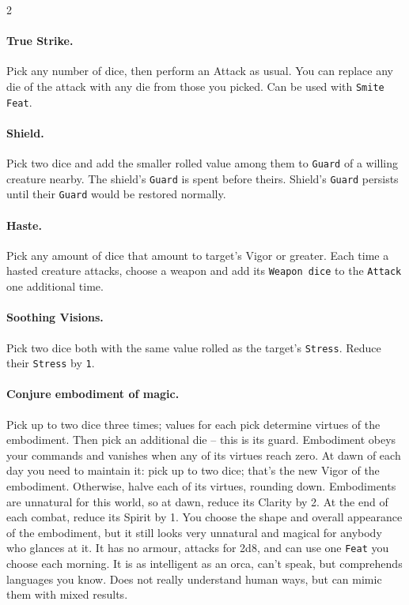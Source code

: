 \documentclass{osr-template/zine}
\begin{document}
\begin{multicols*}{2}
\paragraph{True Strike.}
Pick any number of dice, then perform an Attack as usual.
You can replace any die of the attack with any die from those you picked.
Can be used with \texttt{Smite} \texttt{Feat}.

\paragraph{Shield.} Pick two dice and add the smaller rolled value among them to \texttt{Guard} of a willing creature nearby.
 The shield's \texttt{Guard} is spent before theirs.
 Shield's \texttt{Guard} persists until their \texttt{Guard} would be restored normally.

\paragraph{Haste.} Pick any amount of dice that amount to target's Vigor or greater.
Each time a hasted creature attacks, choose a weapon and add its \texttt{Weapon dice} to the \texttt{Attack} one additional time.

\paragraph{Soothing Visions. } Pick two dice both with the same value rolled as the target's \texttt{Stress}. Reduce their \texttt{Stress} by \texttt{1}.

\paragraph{Conjure embodiment of magic.} Pick up to two dice three times; values for each pick determine virtues of the embodiment.
Then pick an additional die -- this is its guard.
Embodiment obeys your commands and vanishes when any of its virtues reach zero.
At dawn of each day you need to maintain it: pick up to two dice; that's the new Vigor of the embodiment.
Otherwise, halve each of its virtues, rounding down. Embodiments are unnatural for this world, so at dawn, reduce its Clarity by 2.
At the end of each combat, reduce its Spirit by 1.
You choose the shape and overall appearance of the embodiment, but it still looks very unnatural and magical for anybody who glances at it.
It has no armour, attacks for 2d8, and can use one \texttt{Feat} you choose each morning.
It is as intelligent as an orca, can't speak, but comprehends languages you know.
Does not really understand human ways, but can mimic them with mixed results.

\end{multicols*}
\end{document}
